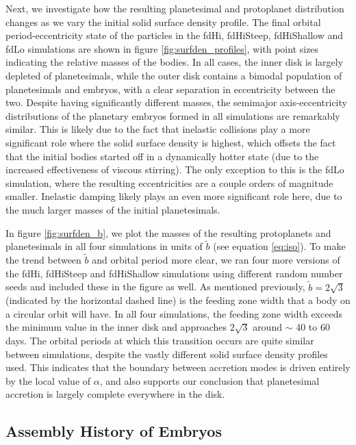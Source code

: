 Next, we investigate how the resulting planetesimal and protoplanet distribution
changes as we vary the initial solid surface density profile.
The final orbital period-eccentricity state of the
particles in the fdHi, fdHiSteep, fdHiShallow and fdLo simulations are shown in figure \ref{fig:surfden_profiles}, with point sizes 
indicating the relative masses of the bodies. In all cases, the inner disk is largely depleted of planetesimals, while the outer disk 
contains a bimodal population of planetesimals and embryos, with a clear separation in eccentricity between the two. Despite 
having significantly different masses, the semimajor axis-eccentricity distributions of the planetary embryos formed in all simulations are remarkably similar. This 
is likely due to the fact that inelastic collisions play a more significant role where the solid surface density is highest, which 
offsets the fact that the initial bodies started off in a dynamically hotter state (due to the increased effectiveness of viscous stirring). The only exception to this is the fdLo simulation, 
where the resulting eccentricities are a couple orders of magnitude smaller. Inelastic damping likely plays an even more 
significant role here, due to the much larger masses of the initial planetesimals.

In figure \ref{fig:surfden_b}, we plot the masses of the resulting protoplanets and planetesimals in all four simulations in units of $
\tilde{b}$ (see equation \ref{eq:iso}). To make the trend between $\tilde{b}$ and orbital period more clear, we ran four more versions of the fdHi, fdHiSteep and fdHiShallow simulations using different random number seeds and included these in the figure as well.
As mentioned previously, $\tilde{b} = 2 \sqrt{3}$ (indicated by the horizontal dashed line) is the  
feeding zone width that a body on a circular orbit will have. In all four simulations, the feeding zone width exceeds the 
minimum value in the inner disk and approaches $2 \sqrt{3}$ around $\sim$ 40 to 60 days. The orbital periods at which this transition 
occurs are quite similar between simulations, despite the vastly different solid surface density profiles used. This indicates that 
the boundary between accretion modes is driven entirely by the local value of $\alpha$, and also supports our 
conclusion that planetesimal accretion is largely complete everywhere in the disk.

\subsection{Assembly History of Embryos}\label{sec:assembly}

